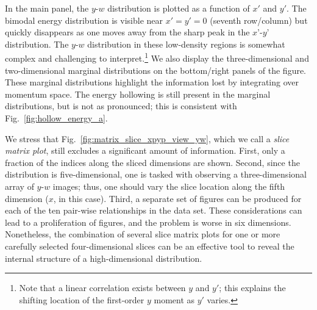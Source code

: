 \documentclass[%
 reprint,
nofootinbib,
 amsmath,amssymb,
 aps,
prstab,
]{revtex4-2}
\begin{document}
In the main panel, the $y$-$w$ distribution is plotted as a function of $x'$ and $y'$. The bimodal energy distribution is visible near $x'=y'=0$ (seventh row/column) but quickly disappears as one moves away from the sharp peak in the $x’$-$y’$ distribution. The $y$-$w$ distribution in these low-density regions is somewhat complex and challenging to interpret.\footnote{Note that a linear correlation exists between $y$ and $y'$; this explains the shifting location of the first-order $y$ moment as $y'$ varies.} We also display the three-dimensional and two-dimensional marginal distributions on the bottom/right panels of the figure. These marginal distributions highlight the information lost by integrating over momentum space. The energy hollowing is still present in the marginal distributions, but is not as pronounced; this is consistent with Fig.~\ref{fig:hollow_energy_a}.

We stress that Fig.~\ref{fig:matrix_slice_xpyp_view_yw}, which we call a \textit{slice matrix plot}, still excludes a significant amount of information. First, only a fraction of the indices along the sliced dimensions are shown. Second, since the distribution is five-dimensional, one is tasked with observing a three-dimensional array of $y$-$w$ images; thus, one should vary the slice location along the fifth dimension ($x$, in this case). Third, a separate set of figures can be produced for each of the ten pair-wise relationships in the data set. These considerations can lead to a proliferation of figures, and the problem is worse in six dimensions. Nonetheless, the combination of several slice matrix plots for one or more carefully selected four-dimensional slices can be an effective tool to reveal the internal structure of a high-dimensional distribution.
\end{document}
